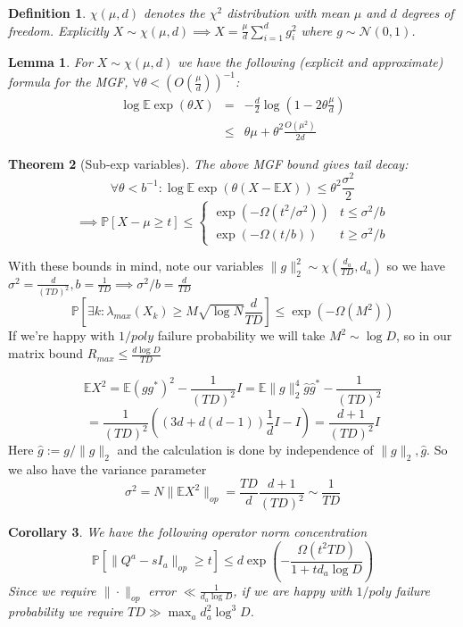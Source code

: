\documentclass{article}
\newtheorem{theorem}{Theorem}
\newtheorem{corollary}[theorem]{Corollary}
\newtheorem{lemma}[theorem]{Lemma}
\newtheorem{definition}{Definition}
\newcommand{\E}{\mathbb{E}}
\renewcommand{\Pr}{\mathbb{P}}
\begin{document}
\begin{definition}
$\chi(\mu,d)$ denotes the $\chi^{2}$ distribution with mean $\mu$ and $d$ degrees of freedom. Explicitly $X \sim \chi(\mu,d) \implies X = \frac{\mu}{d} \sum_{i=1}^{d} g_{i}^{2}$
where $g \sim \mathcal{N}(0,1)$.
\end{definition}

\begin{lemma}
For $X \sim \chi(\mu,d)$ we have the following (explicit and approximate) formula for the MGF, $\forall \theta < \left(O(\frac{\mu}{d}) \right)^{-1}$:
\begin{eqnarray*} \log \E \exp(\theta X) & = & - \frac{d}{2} \log \left(1 - 2 \theta \frac{\mu}{d} \right)
\\ & \leq & \theta \mu + \theta^{2} \frac{O(\mu^{2})}{2 d}
\end{eqnarray*}
\end{lemma}

\begin{theorem} [Sub-exp variables]
The above MGF bound gives tail decay:
\[ \forall \theta < b^{-1}: \log \E \exp(\theta (X - \E X)) \leq \theta^{2} \frac{\sigma^{2}}{2} \]
\[ \implies  \Pr[X - \mu \geq t] \leq \begin{cases}
\exp( - \Omega(t^{2}/\sigma^{2}) ) & t \leq \sigma^{2}/b
\\ \exp( - \Omega(t/b) ) & t \geq \sigma^{2}/b
\end{cases}   \]
\end{theorem}

With these bounds in mind, note our variables $\|g\|_{2}^{2} \sim \chi(\frac{d_{a}}{TD},d_{a})$ so we have $\sigma^{2} = \frac{d}{(TD)^{2}}, b = \frac{1}{TD} \implies \sigma^{2}/b = \frac{d}{TD}$
\[ \Pr[ \exists k: \lambda_{max}(X_{k}) \geq M \sqrt{\log N}\frac{d}{TD} ] \leq \exp( - \Omega(M^{2}) )  \]
If we're happy with $1/poly$ failure probability we will take $M^{2} \sim \log D$, so in our matrix bound $R_{max} \leq \frac{d \log D}{TD}$

\[ \E X^{2} = \E (g g^{*})^{2} - \frac{1}{(TD)^{2}} I = \E \|g\|_{2}^{4} \hat{g} \hat{g}^{*} - \frac{1}{(TD)^{2}} \]
\[ = \frac{1}{(TD)^{2}} ( (3d + d(d-1)) \frac{1}{d} I - I ) = \frac{d+1}{(TD)^{2}} I   \]
Here $\hat{g} := g / \|g\|_{2}$ and the calculation is done by independence of $\|g\|_{2}, \hat{g}$. So we also have the variance parameter
\[ \sigma^{2} = N \|\E X^{2}\|_{op} = \frac{TD}{d} \frac{d+1}{(TD)^{2}} \sim \frac{1}{TD}  \]

\begin{corollary}
We have the following operator norm concentration
\[ \Pr[ \|Q^{a} - sI_{a}\|_{op} \geq t ] \leq d \exp \left( - \frac{\Omega(t^{2} TD)}{1 + t d_{a} \log D }  \right)  \]
Since we require $\|\cdot\|_{op}$ error $\ll \frac{1}{d_{a} \log D}$, if we are happy with $1/poly$ failure probability we require $TD \gg \max_{a} d_{a}^{2} \log^{3} D$.
\end{corollary}
\end{document}
